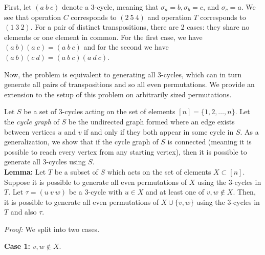 \documentclass{article}
\begin{document}
    First, let $(a\ b\ c)$ denote a 3-cycle, meaning that $\sigma_a = b, \sigma_b = c$, and $\sigma_c = a$. We see that operation $C$ corresponds to $(2\ 5\ 4)$ and operation $T$ corresponds to $(1\ 3\ 2)$. For a pair of distinct transpositions, there are 2 cases: they share no elements or one element in common. For the first case, we have $(a\ b)(a\ c) = (a\ b\ c)$ and for the second we have $(a\ b)(c \ d) = (a\ b\ c)(a\ d\ c)$.

    Now, the problem is equivalent to generating all 3-cycles, which can in turn generate all pairs of transpositions and so all even permutations. We provide an extension to the setup of this problem on arbitrarily sized permutations.
    
    Let $S$ be a set of 3-cycles acting on the set of elements $[n] = \{1, 2, \dots, n\}$. Let the \textit{cycle graph} of $S$ be the undirected graph formed where an edge exists between vertices $u$ and $v$ if and only if they both appear in some cycle in $S$. As a generalization, we show that if the cycle graph of $S$ is connected (meaning it is possible to reach every vertex from any starting vertex), then it is possible to generate all 3-cycles using $S$. \\

    \textbf{Lemma:} Let $T$ be a subset of $S$ which acts on the set of elements $X\subset [n]$. Suppose it is possible to generate all even permutations of $X$ using the 3-cycles in $T$. Let $\tau = (u\ v\ w)$ be a 3-cycle with $u\in X$ and at least one of $v, w\notin X$. Then, it is possible to generate all even permutations of $X\cup \{v, w\}$ using the 3-cycles in $T$ and also $\tau$.
    
    \textit{Proof:}  We split into two cases.

    \textbf{Case 1:} $v, w\notin X$.
\end{document}
